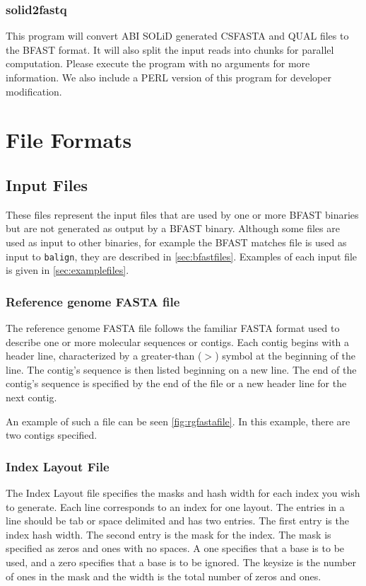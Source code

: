 \documentclass[a4paper,12pt]{book}
\newcommand{\TT}[1]{{\tt #1}} %
\newcommand{\rGFF}{reference genome FASTA file}
\newcommand{\RGFF}{Reference genome FASTA file}
\newcommand{\BMF}{BFAST matches file} %
\begin{document}
\subsection{solid2fastq}
This program will convert ABI SOLiD generated CSFASTA and QUAL files to the BFAST format.
It will also split the input reads into chunks for parallel computation.
Please execute the program with no arguments for more information.
We also include a PERL version of this program for developer modification.
\chapter{File Formats}
\section{Input Files}
\label{sec:inputfiles}
These files represent the input files that are used by one or more BFAST binaries but are not generated as output by a BFAST binary.
Although some files are used as input to other binaries, for example the \BMF{} is used as input to \TT{balign}, they are described in \autoref{sec:bfastfiles}.
Examples of each input file is given in \autoref{sec:examplefiles}.
\subsection{\RGFF{}}
\label{sec:rgfastafile}
The \rGFF{} follows the familiar FASTA format used to describe one or more molecular sequences or contigs.
Each contig begins with a header line, characterized by a greater-than ($>$) symbol at the beginning of the line.
The contig's sequence is then listed beginning on a new line.
The end of the contig's sequence is specified by the end of the file or a new header line for the next contig.

An example of such a file can be seen \autoref{fig:rgfastafile}.
In this example, there are two contigs specified. 

\subsection{Index Layout File}
\label{sec:layoutfile}
The Index Layout file specifies the masks and hash width for each index you wish to generate.
Each line corresponds to an index for one layout.
The entries in a line should be tab or space delimited and has two entries.
The first entry is the index hash width.
The second entry is the mask for the index.
The mask is specified as zeros and ones with no spaces.
A one specifies that a base is to be used, and a zero specifies that a base is to be ignored.
The keysize is the number of ones in the mask and the width is the total number of zeros and ones.
\end{document}
